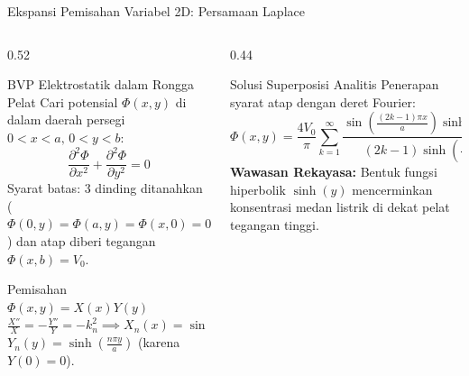 \documentclass[aspectratio=169,10pt]{beamer}
\begin{document}
\begin{frame}{Ekspansi Pemisahan Variabel 2D: Persamaan Laplace}
  \begin{columns}[t]
    \begin{column}{0.52\textwidth}
      \begin{block}{BVP Elektrostatik dalam Rongga Pelat}
        \small
        Cari potensial $\Phi(x,y)$ di dalam daerah persegi $0 < x < a, \, 0 < y < b$:
        \begin{equation*}
          \frac{\partial^2 \Phi}{\partial x^2} + \frac{\partial^2 \Phi}{\partial y^2} = 0
        \end{equation*}
        Syarat batas: 3 dinding ditanahkan ($\Phi(0,y) = \Phi(a,y) = \Phi(x,0) = 0$) dan atap diberi tegangan $\Phi(x,b) = V_0$.
      \end{block}
      \begin{alertblock}{Pemisahan $\Phi(x,y) = X(x) Y(y)$}
        \small
        $\frac{X''}{X} = -\frac{Y''}{Y} = -k_n^2 \implies X_n(x) = \sin\left(\frac{n\pi x}{a}\right)$\\
        $Y_n(y) = \sinh\left(\frac{n\pi y}{a}\right)$ (karena $Y(0) = 0$).
      \end{alertblock}
    \end{column}
    \begin{column}{0.44\textwidth}
      \begin{exampleblock}{Solusi Superposisi Analitis}
        \small
        Penerapan syarat atap dengan deret Fourier:
        \begin{equation*}
          \Phi(x, y) = \frac{4V_0}{\pi} \sum_{k=1}^{\infty} \frac{\sin\left(\frac{(2k-1)\pi x}{a}\right) \sinh\left(\frac{(2k-1)\pi y}{a}\right)}{(2k-1) \sinh\left(\frac{(2k-1)\pi b}{a}\right)}
        \end{equation*}
        \textbf{Wawasan Rekayasa:}
        Bentuk fungsi hiperbolik $\sinh(y)$ mencerminkan konsentrasi medan listrik di dekat pelat tegangan tinggi.
      \end{exampleblock}
    \end{column}
  \end{columns}
\end{frame}
\end{document}
